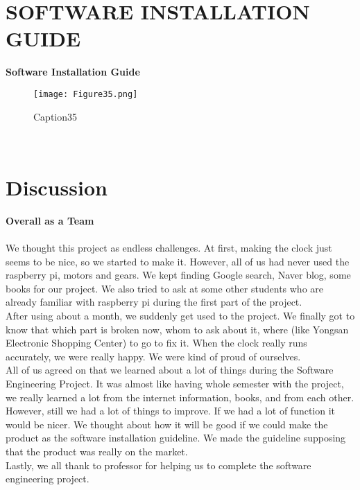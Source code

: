 \documentclass[10pt,a4paper,twocolumn]{report}
\begin{document}
\section{SOFTWARE INSTALLATION GUIDE }		
	 \textbf{Software Installation Guide}	
		\begin{figure}[h]
				\texttt{[image: Figure35.png]}
				\caption{Caption35}
				\label{fig35}
		\end{figure}	\\

\section{Discussion}	
	\textbf{Overall as a Team} \\\\
		
	 We thought this project as endless challenges. At first, making the clock just seems to be nice, so we started to make it. However, all of us had never used the raspberry pi, motors and gears. We kept finding Google search, Naver blog, some books for our project. We also tried to ask at some other students who are already familiar with raspberry pi during the first part of the project. \\
	  \indent After using about a month, we suddenly get used to the project. We finally got to know that which part is broken now, whom to ask about it, where (like Yongsan Electronic Shopping Center) to go to fix it. When the clock really runs accurately, we were really happy. We were kind of proud of ourselves. \\
    \indent All of us agreed on that we learned about a lot of things during the Software Engineering Project. It was almost like having whole semester with the project, we really learned a lot from the internet information, books, and from each other. \\
     \indent However, still we had a lot of things to improve. If we had a lot of function it would be nicer. We thought about how it will be good if we could make the product as the software installation guideline. We made the guideline supposing that the product was really on the market. \\
    \indent Lastly, we all thank to professor for helping us to complete the software engineering project. \\\\\\
\end{document}
